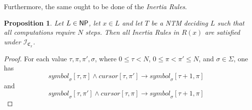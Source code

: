 \documentclass [11pt]{article}
\newtheorem{proposition}[theorem]{Proposition}
\newcommand{\ra}{\rightarrow}
\newcommand{\ccfont}[1]{\protect\mathsf{#1}}
\newcommand{\NP}{\ccfont{NP}}
\newcommand{\sym}[3]{\textit{symbol}_{#1}[#2,#3]}
\newcommand{\cursor}[2]{\textit{cursor}[#1,#2]}
\newcommand{\sequ}[1]{\mathfrak{C}_{#1}}
\newcommand{\sequint}[2]{ \mathcal{#1}_{\mathfrak{C}_{#2}}}
\begin{document}
Furthermore, the same ought to be done of the \emph{Inertia Rules}.
\begin{proposition}
\label{prop:r-inertia}
Let $L \in \NP$, let $x \in L$ and let $T$ be a NTM deciding $L$ such that all computations require $N$ steps. Then all  \emph{Inertia Rules} in $R(x)$ are satisfied under $\sequint{I}{x}$.
\end{proposition}
\begin{proof}
For each value $\tau, \pi, \pi', \sigma$,
where $0 \leq \tau < N$, $0 \leq \pi < \pi' \leq N$, and $\sigma \in \Sigma$, one has
\begin{equation*}
 \sym{\sigma}{\tau}{\pi} \land \cursor{\tau}{\pi'} \ra 
\sym{\sigma}{\tau+1}{\pi}
\end{equation*}
and 
\begin{equation*}
 \sym{\sigma}{\tau}{\pi'} \land \cursor{\tau}{\pi} \ra 
\sym{\sigma}{\tau+1}{\pi}
\end{equation*}


\end{proof}
\end{document}
